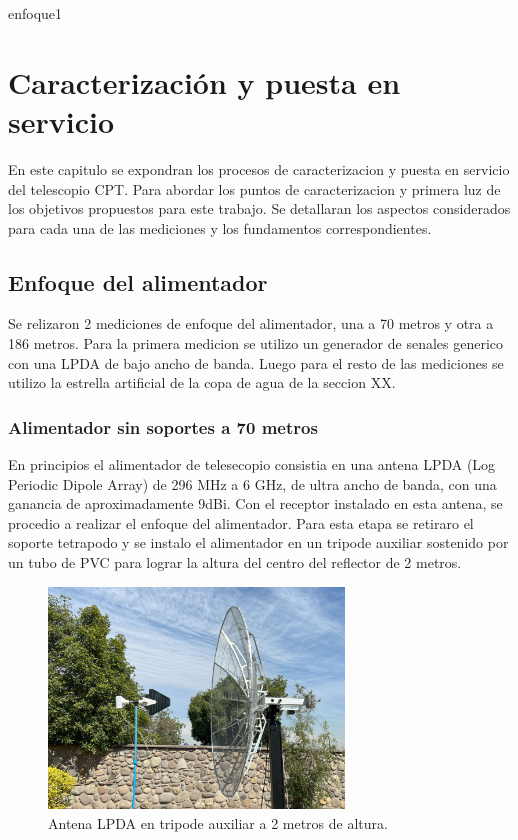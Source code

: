 enfoque1\chapter{Caracterización y puesta en servicio}

En este capitulo se expondran los procesos de caracterizacion y puesta en servicio del telescopio CPT. Para abordar los puntos de caracterizacion y primera luz de los objetivos propuestos para este trabajo. Se detallaran los aspectos considerados para cada una de las mediciones y los fundamentos correspondientes.

\section{Enfoque del alimentador}

Se relizaron 2 mediciones de enfoque del alimentador, una a 70 metros y otra a 186 metros. Para la primera medicion se utilizo un generador de senales generico con una LPDA de bajo ancho de banda. Luego para el resto de las mediciones se utilizo la estrella artificial de la copa de agua de la seccion XX.\\

\subsection{Alimentador sin soportes a 70 metros}

En principios el alimentador de telesecopio consistia en una antena LPDA (Log Periodic Dipole Array) de 296 MHz a 6 GHz, de ultra ancho de banda, con una ganancia de aproximadamente 9dBi. Con el receptor instalado en esta antena, se procedio a realizar el enfoque del alimentador. Para esta etapa se retiraro el soporte tetrapodo y se instalo el alimentador en un tripode auxiliar sostenido por un tubo de PVC para lograr la altura del centro del reflector de 2 metros.\\

\begin{figure}
    \centering
    \includegraphics[width=0.7\textwidth]{img/enfoque1}
    \caption{Antena LPDA en tripode auxiliar a 2 metros de altura.}
    \label{fig:antena_lpda}
\end{figure}

